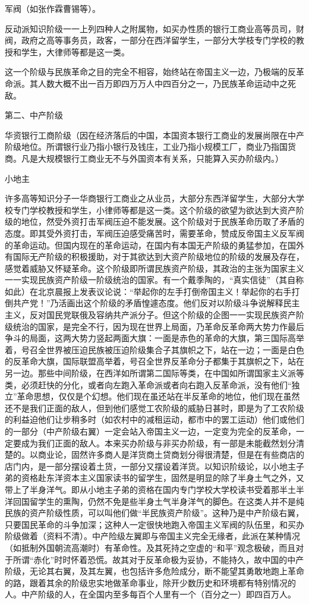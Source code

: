 军阀（如张作霖曹锡等）。

反动派知识阶级一一上列四种人之附属物，如买办性质的银行工商业高等员司，财阀，政府之高等事务员，政客，一部分在西洋留学生，一部分大学枝专门学校的教授和学生，大律师等都是这一类。

这一个阶级与民族革命之目的完全不相容，始终站在帝国主义一边，乃极端的反革命派。其人数大概不出一百万即四万万人中四百分之一，乃民族革命运动中之死敌。

第二、中产阶级

华资银行工商阶级（因在经济落后的中国，本国资本银行工商业的发展尚限在中产阶级地位。所谓银行业乃指小银行及钱庄，工业乃指小规模工厂，商业乃指国货商。凡是大规模银行工商业无不与外国资本有关系，只能算入买办阶级内。）

小地主

许多高等知识分子一华商银行工商业之从业员，大部分东西洋留学生，大部分大学校专门学校教授和学生，小律师等都是这一类。这个阶级的欲望为欲达到大资产阶级的地位，然受外资打击军阀压迫不能发展。这个阶级对于民族革命历取了矛盾的态度。即其受外资打击，军阀压迫感受痛苦时，需要革命，赞成反帝国主义反军阀的革命运动。但国内现在的革命运动，在国内有本国无产阶级的勇猛参加，在国外有国际无产阶级的积极援助，对于其欲达到大资产阶级地位的阶级的发展及存在，感觉着威胁又怀疑革命。这个阶级即所谓民族资产阶级，其政治的主张为国家主义一一实现民族资产阶级一阶级统治的国家。有一个戴季陶的，“真实信徒”（其自称如此）在北京晨报上发表议论说：“举起你的左手打倒帝国主义！举起你的右手打倒共产党！”乃活画出这个阶级的矛盾惶遽态度。他们反对以阶级斗争说解释民主主义，反对国民党联俄及容纳共产派分子。但这个阶级的企图一一实现民族资产阶级统治的国家，是完全不行，因为现在世界上局面，乃革命反革命两大势力作最后争斗的局面，这两大势力竖起两面大旗：一面是赤色的革命的大旗，第三国际高举着，号召全世界被压迫民族被压迫阶级集合子其旗帜之下，站在一边；一面是白色的反革命大旗，国际联盟高举着，号召全世界反革命分子都集于其旗帜之下，站在另一边。那些中间阶级，在西洋如所谓第二国际等类，在中国如所谓国家主义派等类，必须赶快的分化，或者向左跑入革命派或者向右跑入反革命派，没有他们“独立”革命思想，仅仅是个幻想。他们现在虽还站在半反革命的地位，他们现在虽然还不是我们正面的敌人，但到他们感觉工农阶级的威胁日甚时，即是为了工农阶级的利益迫他们让步稍多时（如农村中的减租运动，都市中的罢工运动）他们或他们的一部分（中产阶级右翼）一定会站入帝国主义一边，一定变为完全的反革命，一定要成为我们正面的敌人。本来买办阶级与非买办阶级，有一部是未能截然划分清楚的。以商业论，固然许多商人是洋货商土贷商划分得很清楚，但是在有些商店的店门内，是一部分摆设着土货，一部分又摆设着洋货。以知识阶级论，以小地主子弟的资格赴东洋资本主义国家读书的留学生，固然是明显的除了半身土气之外，又带上了半身洋气。即从小地主子弟的资格在国内专门学校大学校读书受着那半土半洋回国留学生的熏陶，仍然不免是些半身土气半身洋气的脚色。在这类人并不是纯民族的资产阶级性质，可以叫他们做“半民族资产阶级”。这种乃是中产阶级右翼，只要国民革命的斗争加深；这种人一定很快地跑入帝国主义军阀的队伍里，和买办阶级做着（资料不清）。中产险级左翼即与帝国主义完全无缘者，此派在某种情况（如抵制外国朝流高潮时）有革命性。及其死持之空虚的“和平”观念极破，而且对于所谓“赤化”时时怀着恐慌。故其对于反革命极为妥协，不能持久，故中国的中产阶级，无论其右翼，及其左翼，也包括许多危险成分，断不能望其勇敢地跑上革命的路，跟着其余的阶级忠实地做革命事业，除开少数历史和环境都有特别情况的人。中产阶级的人，在全国内至多每百个人里有一个（百分之一）即四百万人。


